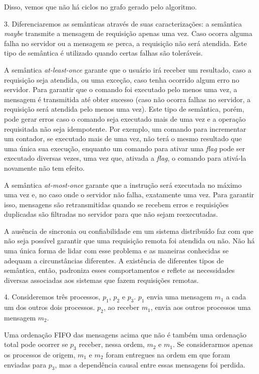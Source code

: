\documentclass[a4paper]{article}
\begin{document}
Disso, vemos que não há ciclos no grafo gerado pelo algoritmo.

\bigskip

3. Diferenciaremos as semânticas através de suas caracterizações: a semântica \textit{maybe} transmite a mensagem de requisição apenas uma vez.
Caso ocorra alguma falha no servidor ou a mensagem se perca, a requisição não será atendida.
Este tipo de semântica é utilizado quando certas falhas são toleráveis.

A semântica \textit{at-least-once} garante que o usuário irá receber um resultado, caso a requisição seja atendida, ou uma exceção, caso tenha ocorrido algum erro no servidor.
Para garantir que o comando foi executado pelo menos uma vez, a mensagem é transmitida até obter sucesso (caso não ocorra falhas no servidor, a requisição será atendida pelo menos uma vez).
Este tipo de semântica, porém, pode gerar erros caso o comando seja executado mais de uma vez e a operação requisitada não seja idempotente.
Por exemplo, um comando para incrementar um contador, se executado mais de uma vez, não terá o mesmo resultado que uma única sua execução, enquanto um comando para ativar uma \textit{flag} pode ser executado diversas vezes, uma vez que, ativada a \textit{flag}, o comando para ativá-la novamente não tem efeito.

A semântica \textit{at-most-once} garante que a instrução será executada no máximo uma vez e, no caso onde o servidor não falha, exatamente uma vez.
Para garantir isso, mensagens são retransmitidas quando se recebem erros e requisições duplicadas são filtradas no servidor para que não sejam reexecutadas. 

A ausência de sincronia ou confiabilidade em um sistema distribuído faz com que não seja possível garantir que uma requisição remota foi atendida ou não.
Não há uma única forma de lidar com esse problema e as maneiras conhecidas se adequam a circunstâncias diferentes.
A existência de diferentes tipos de semântica, então, padroniza esses comportamentos e reflete as necessidades diversas associadas aos sistemas que fazem requisições remotas.


\bigskip


4. Consideremos três processos, $p_1$, $p_2$ e $p_3$.
$p_1$ envia uma mensagem $m_1$ a cada um dos outros dois processos.
$p_2$, ao receber $m_1$, envia aos outros processos uma mensagem $m_2$.

Uma ordenação FIFO das mensagens acima que não é também uma ordenação total pode ocorrer se $p_3$ receber, nessa ordem, $m_2$ e $m_1$.
Se considerarmos apenas os processos de origem, $m_1$ e $m_2$ foram entregues na ordem em que foram enviadas para $p_3$, mas a dependência causal entre essas mensagens foi perdida.
\end{document}
